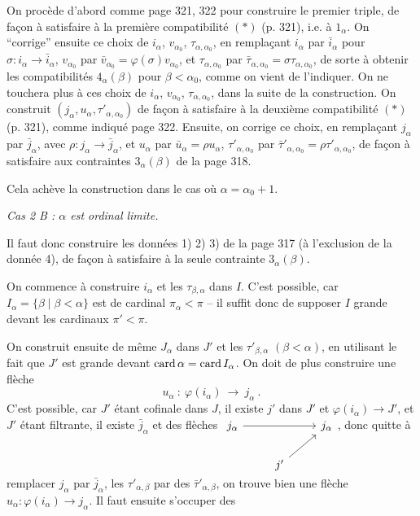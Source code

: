 On procède d'abord comme page 321, 322 pour construire le premier triple, de façon à satisfaire à la première compatibilité $(*)$ (p. 321), i.e. à $1_\alpha$. On “corrige” ensuite ce choix de $i_\alpha$, $v_{\alpha_0}$, $\tau_{\alpha,\alpha_0}$, en remplaçant $i_\alpha$ par $\bar{i}_\alpha$ pour $\sigma:i_\alpha\longrightarrow\bar{i}_\alpha$, $v_{\alpha_0}$ par $\bar{v}_{\alpha_0}=\varphi(\sigma)v_{\alpha_0}$, et $\tau_{\alpha,\alpha_0}$ par $\bar{\tau}_{\alpha,\alpha_0}=\sigma\tau_{\alpha,\alpha_0}$, de sorte à obtenir les compatibilités $4_\alpha(\beta)$ pour $\beta<\alpha_0$, comme on vient de l'indiquer. On ne touchera plus à ces choix de $i_\alpha$, $v_{\alpha_0}$, $\tau_{\alpha,\alpha_0}$, dans la suite de la construction. On construit $(j_\alpha,u_\alpha,\tau'_{\alpha,\alpha_0})$ de façon à satisfaire à la deuxième compatibilité $(*)$ (p. 321), comme
indiqué page 322. Ensuite, on corrige ce choix, en remplaçant $j_\alpha$ par $\bar{j}_\alpha$, avec $\rho:j_\alpha\longrightarrow\bar{j}_\alpha$, et $u_\alpha$ par $\bar{u}_\alpha=\rho u_\alpha$, $\tau'_{\alpha,\alpha_0}$ par $\bar{\tau}'_{\alpha,\alpha_0}=\rho\tau'_{\alpha,\alpha_0}$, de façon à satisfaire aux contraintes $3_\alpha(\beta)$ de la page 318.

Cela achève la construction dans le cas où $\alpha=\alpha_0+1$.

\textit{Cas 2 B : $\alpha$ est ordinal limite.}

Il faut donc construire les données 1) 2) 3) de la page 317 (à l'exclusion de la donnée 4), de façon à satisfaire à la seule contrainte $3_\alpha(\beta)$.

On commence à construire $i_\alpha$ et les $\tau_{\beta,\alpha}$ dans $I$. C'est possible, car $I_\alpha=\{\beta\mid\beta<\alpha\}$ est de cardinal $\pi_\alpha<\pi$ – il suffit donc de supposer $I$ grande devant les cardinaux $\pi'<\pi$.

On construit ensuite de même $J_\alpha$ dans $J'$ et les $\tau'_{\beta,\alpha}$ $(\beta<\alpha)$, en utilisant le %
fait que $J'$ est grande devant $\operatorname{card}\alpha=\operatorname{card} I_\alpha$. On doit de plus construire une flèche
\[
u_\alpha\ :\ \varphi(i_\alpha)\ \longrightarrow\ j_\alpha\ .
\]
C'est possible, car $J'$ étant cofinale dans $J$, il existe $j'$ dans $J'$ et $\varphi(i_\alpha)\longrightarrow J'$, et $J'$ étant filtrante, il existe $\bar{j}_\alpha$ et des flèches %
$\begin{tikzcd}[ampersand replacement=\&, baseline=(\tikzcdmatrixname-1-1.base)]
j_\alpha \arrow[rr] \& \& j_\alpha \\
\& j' \arrow[ur] \&
\end{tikzcd}$, donc quitte à remplacer $j_\alpha$ par $\bar{j}_\alpha$, les $\tau'_{\alpha,\beta}$ par des $\bar{\tau}'_{\alpha,\beta}$, on trouve bien une flèche $u_\alpha:\varphi(i_\alpha)\longrightarrow j_\alpha$. Il faut ensuite s'occuper des %


